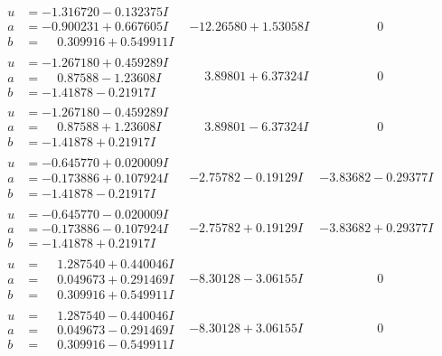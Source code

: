 \documentclass[1p]{elsarticle_modified}
\theoremstyle{definition}
\begin{document}
$$\begin{array}{c|c|c}
\begin{aligned}
u &= -1.316720 - 0.132375 I \\
a &= -0.900231 + 0.667605 I \\
b &= \phantom{-}0.309916 + 0.549911 I\end{aligned}
 & -12.26580 + 1.53058 I & \phantom{-0.000000 } 0 \\ \hline\begin{aligned}
u &= -1.267180 + 0.459289 I \\
a &= \phantom{-}0.87588 - 1.23608 I \\
b &= -1.41878 - 0.21917 I\end{aligned}
 & \phantom{-}3.89801 + 6.37324 I & \phantom{-0.000000 } 0 \\ \hline\begin{aligned}
u &= -1.267180 - 0.459289 I \\
a &= \phantom{-}0.87588 + 1.23608 I \\
b &= -1.41878 + 0.21917 I\end{aligned}
 & \phantom{-}3.89801 - 6.37324 I & \phantom{-0.000000 } 0 \\ \hline\begin{aligned}
u &= -0.645770 + 0.020009 I \\
a &= -0.173886 + 0.107924 I \\
b &= -1.41878 - 0.21917 I\end{aligned}
 & -2.75782 - 0.19129 I & -3.83682 - 0.29377 I \\ \hline\begin{aligned}
u &= -0.645770 - 0.020009 I \\
a &= -0.173886 - 0.107924 I \\
b &= -1.41878 + 0.21917 I\end{aligned}
 & -2.75782 + 0.19129 I & -3.83682 + 0.29377 I \\ \hline\begin{aligned}
u &= \phantom{-}1.287540 + 0.440046 I \\
a &= \phantom{-}0.049673 + 0.291469 I \\
b &= \phantom{-}0.309916 + 0.549911 I\end{aligned}
 & -8.30128 - 3.06155 I & \phantom{-0.000000 } 0 \\ \hline\begin{aligned}
u &= \phantom{-}1.287540 - 0.440046 I \\
a &= \phantom{-}0.049673 - 0.291469 I \\
b &= \phantom{-}0.309916 - 0.549911 I\end{aligned}
 & -8.30128 + 3.06155 I & \phantom{-0.000000 } 0 \\ \hline\begin{aligned}

\end{aligned}
\end{array}$$
\end{document}
